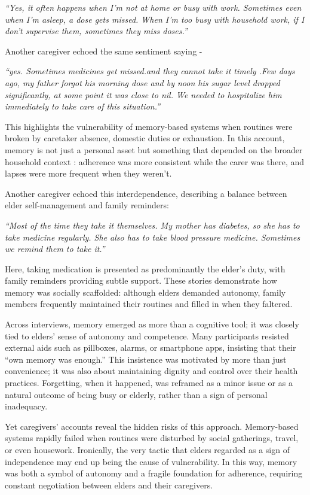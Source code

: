 \documentclass[acmlarge]{acmart}
\begin{document}
\emph{``Yes, it often happens when I'm not at home or busy with work.
Sometimes even when I'm asleep, a dose gets missed. When I'm too busy
with household work, if I don't supervise them, sometimes they miss
doses.''}

Another caregiver echoed the same sentiment saying -

\emph{``yes. Sometimes medicines get missed.and they cannot take it
timely .Few days ago, my father forgot his morning dose and by noon his
sugar level dropped significantly, at some point it was close to nil. We
needed to hospitalize him immediately to take care of this situation.''}

This highlights the vulnerability of memory-based systems when routines
were broken by caretaker absence, domestic duties or exhaustion. In this
account, memory is not just a personal asset but something that depended
on the broader household context : adherence was more consistent while
the carer was there, and lapses were more frequent when they weren't.

Another caregiver echoed this interdependence, describing a balance
between elder self-management and family reminders:

\emph{``Most of the time they take it themselves. My mother has
diabetes, so she has to take medicine regularly. She also has to take
blood pressure medicine. Sometimes we remind them to take it.''}

Here, taking medication is presented as predominantly the elder's duty,
with family reminders providing subtle support. These stories
demonstrate how memory was socially scaffolded: although elders demanded
autonomy, family members frequently maintained their routines and filled
in when they faltered.

Across interviews, memory emerged as more than a cognitive tool; it was
closely tied to elders' sense of autonomy and competence. Many
participants resisted external aids such as pillboxes, alarms, or
smartphone apps, insisting that their ``own memory was enough.'' This
insistence was motivated by more than just convenience; it was also
about maintaining dignity and control over their health practices.
Forgetting, when it happened, was reframed as a minor issue or as a
natural outcome of being busy or elderly, rather than a sign of personal
inadequacy.

Yet caregivers' accounts reveal the hidden risks of this approach.
Memory-based systems rapidly failed when routines were disturbed by
social gatherings, travel, or even housework. Ironically, the very
tactic that elders regarded as a sign of independence may end up being
the cause of vulnerability. In this way, memory was both a symbol of
autonomy and a fragile foundation for adherence, requiring constant
negotiation between elders and their caregivers.
\end{document}
